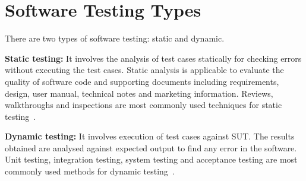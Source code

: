 




\section{Software Testing Types}
There are two types of software testing: static and dynamic.

\textbf{Static testing:} It involves the analysis of test cases statically for checking errors without executing the test cases. Static analysis is applicable to evaluate the quality of software code and supporting documents including requirements, design, user manual, technical notes and marketing information. Reviews, walkthroughs and inspections are most commonly used techniques for static testing~\cite{fairley1978tutorial}.

\textbf{Dynamic testing:} It involves execution of test cases against SUT. The results obtained are analysed against expected output to find any error in the software. Unit testing, integration testing, system testing and acceptance testing are most commonly used methods for dynamic testing~\cite{fairley1978tutorial}.

